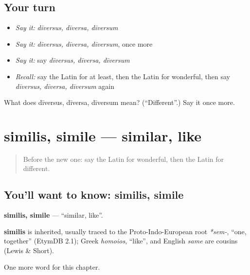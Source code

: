 \subsection*{Your turn}
\begin{itemize}
\raggedright
  \item \emph{Say it:} \emph{dīversus, dīversa, dīversum}
  \item \emph{Say it:} \emph{dīversus, dīversa, dīversum}, once more
  \item \emph{Say it:} say \emph{dīversus, dīversa, dīversum}
  \item \emph{Recall:} say the Latin for at least, then the Latin for wonderful, then say \emph{dīversus, dīversa, dīversum} again
\end{itemize}

\begin{tcolorbox}[breakable,colback=teal!4,colframe=teal!35!black,title={Before you move on}]
What does dīversus, dīversa, dīversum mean? (\textquotedblleft{}Different\textquotedblright{}.) Say it once more.
\end{tcolorbox}
\section[similis, simile]{similis, simile — similar, like}

\label{lesson:LA-C266-similis}



\begin{quote}
Before the new one: say the Latin for wonderful, then the Latin for different.
\end{quote}

\subsection*{You'll want to know: similis, simile}
\textbf{similis, simile} — \textquotedblleft{}similar, like\textquotedblright{}.

\begin{cousinweb}
\textbf{similis} is inherited, usually traced to the Proto-Indo-European root \emph{*sem-}, \textquotedblleft{}one, together\textquotedblright{} (EtymDB 2.1); Greek \emph{homoios}, \textquotedblleft{}like\textquotedblright{}, and English \emph{same} are cousins (Lewis \& Short).
\end{cousinweb}

\begin{grammarlens}[title={What you've built}]
One more word for this chapter.
\end{grammarlens}

